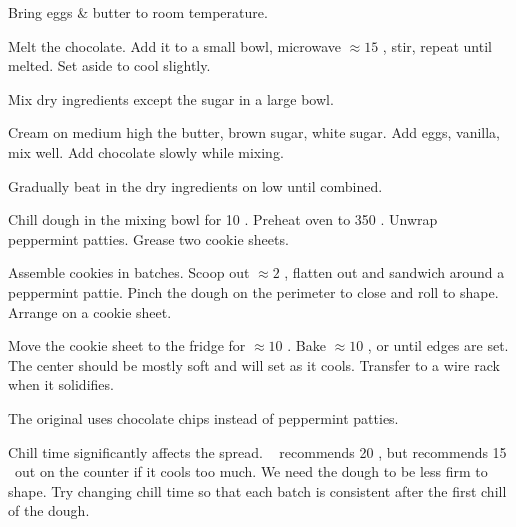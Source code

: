 \begin{preparation}
\item Bring eggs \& butter to room temperature.

\item Melt the chocolate.
	Add it to a small bowl, microwave $\approx 15$ \second, stir, repeat until melted.
	Set aside to cool slightly.

\item Mix dry ingredients except the sugar in a large bowl.

\item Cream on medium high the butter, brown sugar, white sugar.
	Add eggs, vanilla, mix well.
	Add chocolate slowly while mixing.

\item Gradually beat in the dry ingredients on low until combined.

\item Chill dough in the mixing bowl for 10 \minute.
	Preheat oven to 350 \Fahrenheit.
	Unwrap peppermint patties.
	Grease two cookie sheets.

\item Assemble cookies in batches.
	Scoop out $\approx2$ \Tablespoon, flatten out and sandwich around a peppermint pattie.
	Pinch the dough on the perimeter to close and roll to shape.
	Arrange on a cookie sheet.

\item Move the cookie sheet to the fridge for $\approx 10$ \minute.
	Bake $\approx 10$ \minute, or until edges are set.
	The center should be mostly soft and will set as it cools.
	Transfer to a wire rack when it solidifies.
\end{preparation}

\begin{variation}
\item The original uses chocolate chips instead of peppermint patties.
\end{variation}


\begin{experiments}
\item Chill time significantly affects the spread.
	\citeauthor{sallyBrownies2020}~\cite{sallyBrownies2020} recommends 20 \minute, but recommends 15 \minute~out on the counter if it cools too much.
	We need the dough to be less firm to shape.
	Try changing chill time so that each batch is consistent after the first chill of the dough.
\end{experiments}


\recipeend%
